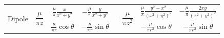 \documentclass[11pt, letterpaper, notitlepage]{article}
\begin{document}
\begin{landscape}
\begin{tabular}{|c|c|c|c|c|c|c|}
\hline \multirow{2}{*}{Dipole} %
  & \multirow{2}{*}{$\dfrac{\mu}{\pi z}$} %
    & $\frac{\mu}{\pi} \frac{x}{x^2+y^2}$ %
    & $-\frac{\mu}{\pi} \frac{y}{x^2+y^2}$ %
  & \multirow{2}{*}{$-\dfrac{\mu}{\pi z^2}$} %
    & $\frac{\mu}{\pi} \frac{y^2-x^2}{(x^2+y^2)^2}$ %
    & $-\frac{\mu}{\pi} \frac{2xy}{(x^2+y^2)^2}$ %
  \\ \cline{3-4} \cline{6-7} 
  & 
    & $\frac{\mu}{\pi r} \cos{\theta}$ %
    & $-\frac{\mu}{\pi r} \sin{\theta}$ %
  & 
    & $-\frac{\mu}{\pi r^2} \cos{\theta}$ %
    & $-\frac{\mu}{\pi r^2} \sin{\theta}$ %
\\


\hline
\end{tabular}
 
\vspace{-4mm}


\end{landscape}
\end{document}
